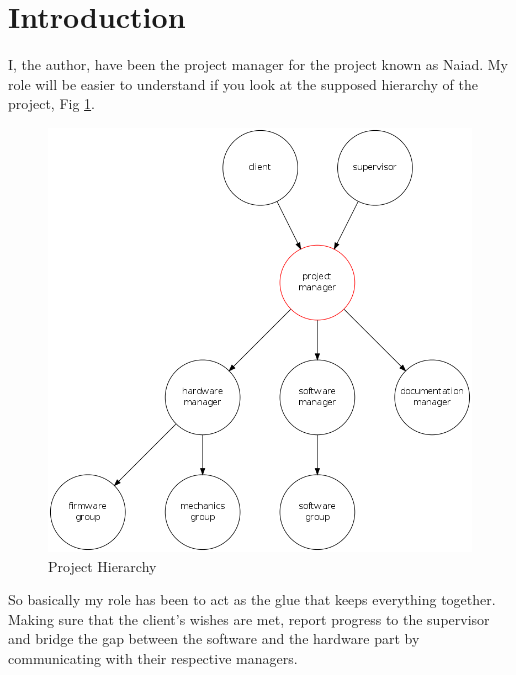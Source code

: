 \section{Introduction}\label{sec:introduction}
I, the author, have been the project manager for the project known as Naiad. My role will be easier to understand if you look at the supposed hierarchy of the project, Fig \ref{fig:hierarchy}.

\begin{figure}[!ht]
\begin{center} 
\includegraphics[scale=0.32]{figure/hierarchy.png} \caption{Project Hierarchy} 
\label{fig:hierarchy} 
\end{center} 
\end{figure}

So basically my role has been to act as the glue that keeps everything together. Making sure that the client's wishes are met, report progress to the supervisor and bridge the gap between the software and  the hardware part by communicating with their respective managers.